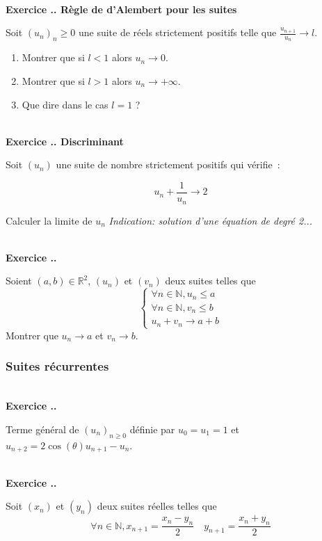 \documentclass{article}
\newcommand{\mb}[1]{\mathbb{#1}}
\newcounter{exo}
\newcommand{\exercice}[1][\null]{\textbf{\\ Exercice \thesection.\theexo. #1} \addtocounter{exo}{1}}
\begin{document}
\exercice[Règle de d'Alembert pour les suites]

Soit $(u_n)_n \ge 0$ une suite de réels strictement positifs telle que $\frac{u_{n+1}}{u_n} \rightarrow l$.

\begin{enumerate}

\item Montrer que si $l<1$ alors $u_n \rightarrow 0$.

\item Montrer que si $l>1$ alors $u_n \rightarrow + \infty$.

\item Que dire dans le cas $l=1$ ?

\end{enumerate}



\exercice[Discriminant]

Soit $(u_n)$ une suite de nombre strictement positifs 
qui vérifie~:

\begin{equation*}
    u_n + \frac{1}{u_n} \rightarrow 2
\end{equation*}

Calculer la limite de $u_n$ \emph{Indication: solution d'une équation de degré
2...}

\exercice

Soient $(a,b) \in \mb{R}^{2}$, $(u_{n})$ et $(v_{n})$ deux suites telles que
\begin{equation*}
    \begin{cases}
        \forall n \in \mb{N}, u_n \leq a \\
        \forall n \in \mb{N}, v_n \leq b \\
        u_n + v_n \to a + b
    \end{cases}
\end{equation*}
Montrer que $u_{n} \to a$ et $v_{n} \to b$.


\subsubsection{Suites récurrentes}

\exercice

Terme général de $(u_n)_{n \ge 0}$ définie par $u_0 = u_1 = 1$ et $u_{n+2} = 2 \cos(\theta) u_{n+1} - u_n$.

\exercice

Soit $(x_{n})$ et $(y_{n})$ deux suites réelles telles que
\begin{equation*}
    \forall n \in \mb{N}, x_{n + 1} = \frac{x_{n} - y_{n}}{2} \quad  y_{n + 1} = \frac{x_{n} + y_{n}}{2}
\end{equation*}
\end{document}
